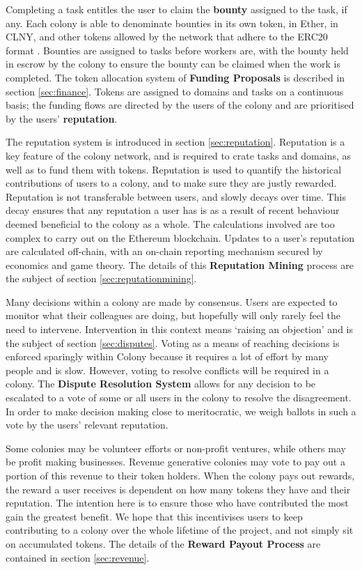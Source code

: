 Completing a task entitles the user to claim the \textbf{bounty} assigned to the task, if any. Each colony is able to denominate bounties in its own token, in Ether, in CLNY, and other tokens allowed by the network that adhere to the ERC20 format \cite{erc20}. Bounties are assigned to tasks before workers are, with the bounty held in escrow by the colony to ensure the bounty can be claimed when the work is completed. The token allocation system of \textbf{Funding Proposals} is described in section \ref{sec:finance}. Tokens are assigned to domains and tasks on a continuous basis; the funding flows are directed by the users of the colony and are prioritised by the users' \textbf{reputation}. 

The reputation system is introduced in section \ref{sec:reputation}. Reputation is a key feature of the colony network, and is required to crate tasks and domains, as well as to fund them with tokens. Reputation is used to quantify the historical contributions of users to a colony, and to make sure they are justly rewarded. Reputation is not transferable between users, and slowly decays over time. This decay ensures that any reputation a user has is as a result of recent behaviour deemed beneficial to the colony as a whole. The calculations involved are too complex to carry out on the Ethereum blockchain. Updates to a user's reputation are calculated off-chain, with an on-chain reporting mechanism secured by economics and game theory. The details of this \textbf{Reputation Mining} process are the subject of section \ref{sec:reputationmining}.

Many decisions within a colony are made by consensus. Users are expected to monitor what their colleagues are doing, but hopefully will only rarely feel the need to intervene. Intervention in this context means `raising an objection' and is the subject of section \ref{sec:disputes}. Voting as a means of reaching decisions is enforced sparingly within Colony because it requires a lot of effort by many people and is slow. However, voting to resolve conflicts will be required in a colony. The \textbf{Dispute Resolution System} allows for any decision to be escalated to a vote of some or all users in the colony to resolve the disagreement. In order to make decision making close to meritocratic, we weigh ballots in such a vote by the users' relevant reputation.

Some colonies may be volunteer efforts or non-profit ventures, while others may be profit making businesses. Revenue generative colonies may vote to pay out a portion of this revenue to their token holders. When the colony pays out rewards, the reward a user receives is dependent on how many tokens they have and their reputation. The intention here is to ensure those who have contributed the most gain the greatest benefit. We hope that this incentivises users to keep contributing to a colony over the whole lifetime of the project, and not simply sit on accumulated tokens. The details of the \textbf{Reward Payout Process} are contained in section \ref{sec:revenue}.